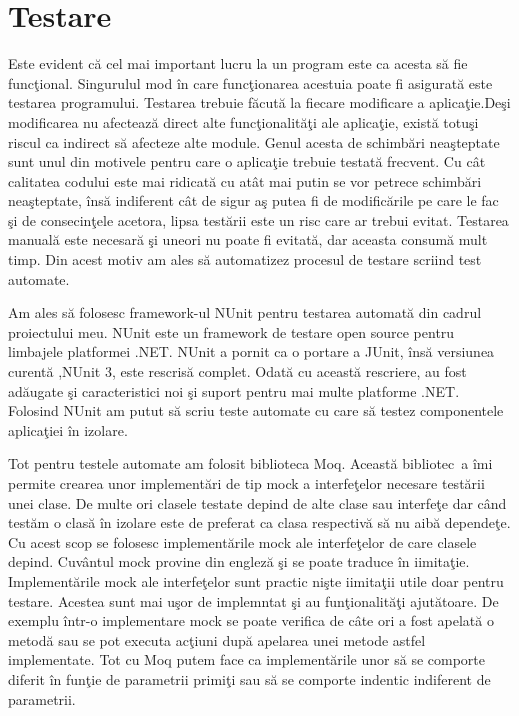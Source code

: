 \documentclass[a4paper,12pt]{report}
\begin{document}
\section{Testare}

Este evident c\u a cel mai important lucru la un program este ca acesta s\u a fie func\c tional.
Singurulul mod \^in care func\c tionarea acestuia poate fi asigurat\u a este testarea programului.
Testarea trebuie f\u acut\u a la fiecare modificare a aplica\c tie.De\c si modificarea nu afecteaz\u a
direct alte func\c tionalit\u a\c ti ale aplica\c tie, exist\u a totu\c si riscul ca indirect s\u a afecteze
alte module. Genul acesta de schimb\u ari nea\c steptate sunt unul din motivele pentru care o aplica\c tie
trebuie testat\u a frecvent. Cu c\^at calitatea codului este mai ridicat\u a cu at\^at mai putin se vor 
petrece schimb\u ari nea\c steptate, \^ins\u a indiferent c\^at de sigur a\c s putea fi de modific\u arile 
pe care le fac \c si de consecin\c tele acetora, lipsa test\u arii este un risc care ar trebui evitat.
Testarea manual\u a este necesar\u a \c si uneori nu poate fi evitat\u a, dar aceasta consum\u a mult timp.
Din acest motiv am ales s\u a automatizez procesul de testare scriind test automate.

Am ales s\u a folosesc framework-ul NUnit pentru testarea automat\u a din cadrul proiectului meu.
NUnit este un framework de testare open source pentru limbajele platformei .NET. NUnit a pornit ca 
o portare a JUnit, \^ins\u a versiunea curent\u a ,NUnit 3, este rescris\u a complet. Odat\u a cu 
aceast\u a rescriere, au fost ad\u augate \c si caracteristici noi \c si suport pentru mai multe platforme .NET.
Folosind NUnit am putut s\u a scriu teste automate cu care s\u a testez componentele aplica\c tiei \^in izolare.

Tot pentru testele automate am folosit biblioteca Moq. Aceast\u a bibliotec\ a \^imi permite crearea unor implement\u ari
de tip mock a interfe\c telor necesare test\u arii unei clase. De multe ori clasele testate depind de alte clase sau 
interfe\c te dar c\^and test\u am o clas\u a \^in izolare este de preferat ca clasa respectiv\u a s\u a nu aib\u a depende\c te.
Cu acest scop se folosesc implement\u arile mock ale interfe\c telor de care clasele depind. Cuv\^antul mock provine din
englez\u a \c si se poate traduce \^in iimita\c tie. Implement\u arile mock ale interfe\c telor sunt practic ni\c ste iimita\c tii 
utile doar pentru testare. Acestea sunt mai u\c sor de implemntat \c si au fun\c tionalit\u a\c ti ajut\u atoare.
De exemplu \^intr-o implementare mock se poate verifica de c\^ate ori a fost apelat\u a o metod\u a sau se pot executa 
ac\c tiuni dup\u a apelarea unei metode astfel implementate. Tot cu Moq putem face ca implement\u arile unor s\u a se comporte diferit 
\^in fun\c tie de parametrii primi\c ti sau s\u a se comporte indentic indiferent de parametrii.
\end{document}

